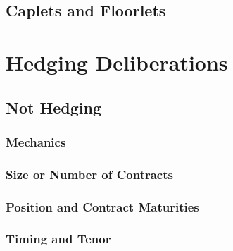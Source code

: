 \documentclass[11pt, a4paper, british]{article}
\begin{document}
\newpage

\subsection{Caplets and Floorlets}



\newpage

\section{Hedging Deliberations}


\newpage

\subsection{Not Hedging}

\subsubsection{Mechanics}

\subsubsection{Size or Number of Contracts}

\subsubsection{Position and Contract Maturities}

\subsubsection{Timing and Tenor}
\end{document}
